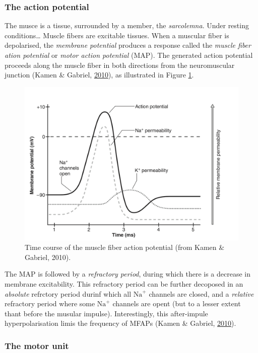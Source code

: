 \documentclass[a4paper,12pt,twoside,openright,oldfontcommands]{memoir}
\begin{document}
\subsubsection{The action potential}\label{the-action-potential}

The musce is a tissue, surrounded by a member, the \emph{sarcolemna}.
Under resting conditions\ldots{} Muscle fibers are excitable tissues.
When a muscular fiber is depolarised, the \emph{membrane potential}
produces a response called the \emph{muscle fiber ation potential} or
\emph{motor action potential} (MAP). The generated action potential
proceeds along the muscle fiber in both directions from the
neuromuscular junction (Kamen \& Gabriel,
\protect\hyperlink{ref-kamen_essentials_2010}{2010}), as illustrated in
Figure \ref{fig:mfap}.

\begin{figure}[H]

{\centering \includegraphics[width=0.75\linewidth]{assets/mfap} 

}

\caption{Time course of the muscle fiber action potential (from Kamen \& Gabriel, 2010).}\label{fig:mfap}
\end{figure}

The MAP is followed by a \emph{refractory period}, during which there is
a decrease in membrane excitability. This refractory period can be
further decoposed in an \emph{absolute} refrctory period durinf which
all \(\text{Na}^{+}\) channels are closed, and a \emph{relative}
refractory period where some \(\text{Na}^{+}\) channels are opent (but
to a lesser extent thant before the musular impulse). Interestingly,
this after-impule hyperpolarisation limis the frequency of MFAPs (Kamen
\& Gabriel, \protect\hyperlink{ref-kamen_essentials_2010}{2010}).

\subsubsection{The motor unit}\label{the-motor-unit}
\end{document}
